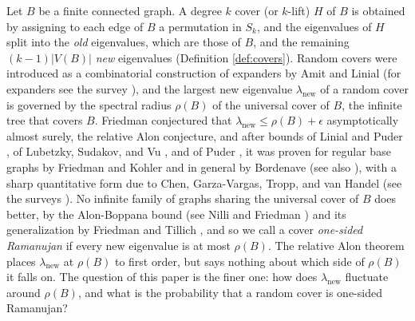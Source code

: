 \documentclass[12pt,oneside,english]{amsart}
\numberwithin{equation}{section}
\numberwithin{figure}{section}
\numberwithin{table}{section}
\theoremstyle{plain}
\numberwithin{thm}{section}
\theoremstyle{plain}
\theoremstyle{plain}
\theoremstyle{plain}
\theoremstyle{definition}
\theoremstyle{definition}
\theoremstyle{definition}
\theoremstyle{remark}
\begin{document}
Let $B$ be a finite connected graph. A degree $k$ cover (or $k$-lift)
$H$ of $B$ is obtained by assigning to each edge of $B$ a permutation
in $S_{k}$, and the eigenvalues of $H$ split into the \emph{old}
eigenvalues, which are those of $B$, and the remaining $(k-1)\left|V(B)\right|$
\emph{new} eigenvalues (Definition \ref{def:covers}). Random covers
were introduced as a combinatorial construction of expanders by Amit
and Linial \cite{AmitLinial2002,AmitLinial2006} (for expanders see
the survey \cite{HooryLinialWigderson2006}), and the largest new eigenvalue
$\lambda_{\mathrm{new}}$ of a random cover is governed by the spectral
radius $\rho(B)$ of the universal cover of $B$, the infinite tree
that covers $B$. Friedman \cite{Friedman2003} conjectured that $\lambda_{\mathrm{new}}\leq\rho(B)+\epsilon$
asymptotically almost surely, the relative Alon conjecture, and after
bounds of Linial and Puder \cite{LinialPuder2010}, of Lubetzky, Sudakov,
and Vu \cite{LubetzkySudakovVu2011}, and of Puder \cite{Puder2015},
it was proven for regular base graphs by Friedman and Kohler \cite{FriedmanKohler2014,FriedmanKohler2019}
and in general by Bordenave \cite{Bordenave2020} (see also \cite{BordenaveCollins2019,BordenaveCollins2023}),
with a sharp quantitative form due to Chen, Garza-Vargas, Tropp, and
van Handel \cite{ChenGarzaVargasTroppVanHandel2026,ChenGarzaVargasVanHandel2026}
(see the surveys \cite{VanHandel2025,VanHandel2026,Bordenave2026}).
No infinite family of graphs sharing the universal cover of $B$ does
better, by the Alon-Boppana bound (see Nilli \cite{Nilli1991,Nilli2004}
and Friedman \cite{Friedman1993}) and its generalization by Friedman
and Tillich \cite{FriedmanTillich2005}, and so we call a cover \emph{one-sided Ramanujan} if every new eigenvalue
is at most $\rho(B)$. The relative Alon theorem places $\lambda_{\mathrm{new}}$
at $\rho(B)$ to first order, but says nothing about which side of
$\rho(B)$ it falls on. The question of this paper is the finer one:
how does $\lambda_{\mathrm{new}}$ fluctuate around $\rho(B)$, and
what is the probability that a random cover is one-sided Ramanujan?
\end{document}
